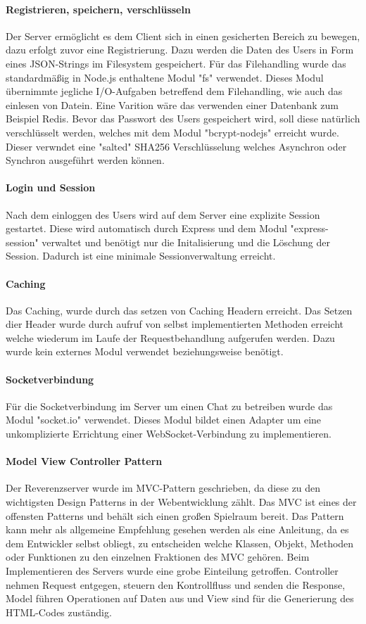 \paragraph{Registrieren, speichern, verschlüsseln}
Der Server ermöglicht es dem Client sich in einen gesicherten Bereich zu bewegen, dazu erfolgt zuvor eine Registrierung. Dazu werden die Daten des Users in Form eines JSON-Strings im Filesystem gespeichert. Für das Filehandling wurde das standardmäßig in Node.js enthaltene Modul "fs" verwendet. Dieses Modul übernimmte jegliche I/O-Aufgaben betreffend dem Filehandling, wie auch das einlesen von Datein. Eine Varition wäre das verwenden einer Datenbank zum Beispiel Redis. Bevor das Passwort des Users gespeichert wird, soll diese natürlich verschlüsselt werden, welches mit dem Modul "bcrypt-nodejs" erreicht wurde. Dieser verwndet eine "salted" SHA256 Verschlüsselung welches Asynchron oder Synchron ausgeführt werden können. 

\paragraph{Login und Session}
Nach dem einloggen des Users wird auf dem Server eine explizite Session gestartet. Diese wird automatisch durch Express und dem Modul "express-session" verwaltet und benötigt nur die Initalisierung und die Löschung der Session. Dadurch ist eine minimale Sessionverwaltung erreicht.

\paragraph{Caching}
Das Caching, wurde durch das setzen von Caching Headern erreicht. Das Setzen dier Header wurde durch aufruf von selbst implementierten Methoden erreicht welche wiederum im Laufe der Requestbehandlung aufgerufen werden. Dazu wurde kein externes Modul verwendet beziehungsweise benötigt.

\paragraph{Socketverbindung}
Für die Socketverbindung im Server um einen Chat zu betreiben wurde das Modul "socket.io" verwendet. Dieses Modul bildet einen Adapter um eine unkomplizierte Errichtung einer WebSocket-Verbindung zu implementieren.

\paragraph{Model View Controller Pattern}
Der Reverenzserver wurde im MVC-Pattern geschrieben, da diese zu den wichtigsten Design Patterns in der Webentwicklung zählt. Das MVC ist eines der offensten Patterns und behält sich einen großen Spielraum bereit. Das Pattern kann mehr als allgemeine Empfehlung gesehen werden als eine Anleitung, da es dem Entwickler selbst obliegt, zu entscheiden welche Klassen, Objekt, Methoden oder Funktionen zu den einzelnen Fraktionen des MVC gehören. Beim Implementieren des Servers wurde eine grobe Einteilung getroffen. Controller nehmen Request entgegen, steuern den Kontrollfluss und senden die Response, Model führen Operationen auf Daten aus und View sind für die Generierung des HTML-Codes zuständig.

